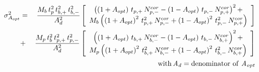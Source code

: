


\begin{eqnarray*}
  \sigma_{A_{opt}}^2 & = & \,
         {\frac{M_b\,t_p^2\,t_{b,+}^2\,t_{b,-}^2} {A_d^2}}
         \left[ \begin{array}{c}
		\left( \left(1+A_{opt}\right)\,t_{p,+}\,N_{p,-}^{cor} -
		         \left(1-A_{opt}\right)\,t_{p,-}\,N_{p,+}^{cor} \right)^2 + \\
		M_b\left( 
			\left(1+A_{opt}\right)^2\,t_{p,+}^2\,N_{p,-}^{cor}
		     +\left(1-A_{opt}\right)^2\,t_{p,-}^2\,N_{p,+}^{cor}
		\right) \\
         \end{array}\right] \\
         & + & 
         {\frac{M_p\,t_b^2\,t_{p,+}^2\,t_{p,-}^2} {A_d^2}}
         \left[ \begin{array}{c}
		\left( \left(1+A_{opt}\right)\,t_{b,+}\,N_{b,-}^{cor} -
		         \left(1-A_{opt}\right)\,t_{b,-}\,N_{b,+}^{cor} \right)^2 + \\
		M_p\left( 
			\left(1+A_{opt}\right)^2\,t_{b,+}^2\,N_{b,-}^{cor}
		     +\left(1-A_{opt}\right)^2\,t_{b,-}^2\,N_{b,+}^{cor}
		\right) \\
         \end{array}\right] \\
         & \, & \mathrm{with \, {\it A_{d}} = 
            denominator \ of \ {\it A_{opt}}}
\end{eqnarray*}

